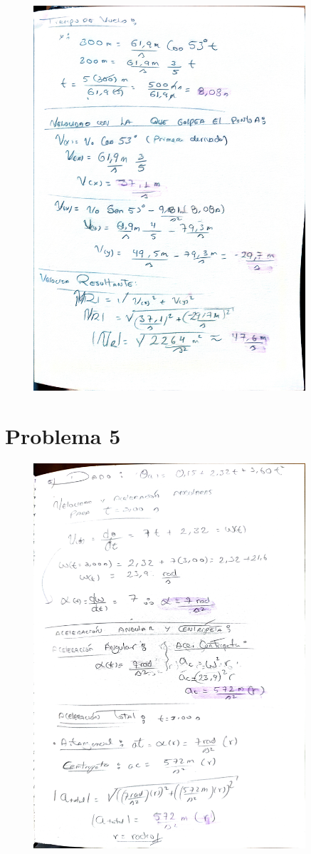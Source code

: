 \documentclass{article}
\begin{document}
\begin{figure}[H]
  \centering
  \includegraphics[width=0.9\textwidth]{assets/42.jpg}
  \label{fig:example_image42}
\end{figure}

\newpage
\section{Problema 5}
\begin{figure}[H]
  \centering
  \includegraphics[width=0.9\textwidth]{assets/5.jpg}
  \label{fig:example_image5}
\end{figure}
\end{document}
